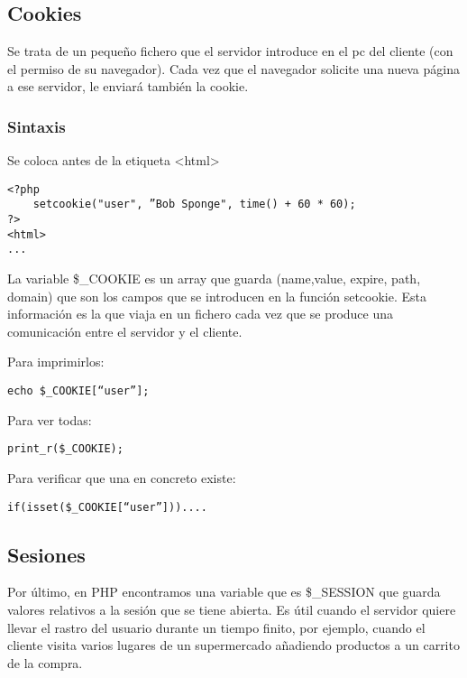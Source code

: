 \documentclass{apuntes}
\begin{document}
\subsection{Cookies}
Se trata de un pequeño fichero que el servidor introduce en el pc del cliente (con el permiso de su navegador). Cada vez que el navegador solicite una nueva página  a ese servidor, le enviará también la cookie.

\subsubsection{Sintaxis}
Se coloca antes de la etiqueta <html>
\begin{verbatim}
<?php
	setcookie("user", ”Bob Sponge", time() + 60 * 60);
?>
<html>
...
\end{verbatim}

La variable \$\_COOKIE es un array que guarda (name,value, expire, path, domain) que son los campos que se introducen en la función setcookie. Esta información es la que viaja en un fichero cada vez que se produce una comunicación entre el servidor y el cliente.

Para imprimirlos:

\begin{verbatim}
echo $_COOKIE[“user”];
\end{verbatim}
Para ver todas:
\begin{verbatim}
print_r($_COOKIE);
\end{verbatim}
Para verificar que una en concreto existe:
\begin{verbatim}
if(isset($_COOKIE[“user”]))....
\end{verbatim}

\subsection{Sesiones}
Por último, en PHP encontramos una variable que es \$\_SESSION que guarda valores relativos a la sesión que se tiene abierta. Es útil cuando el servidor quiere llevar el rastro del usuario durante un tiempo finito, por ejemplo, cuando el cliente visita varios lugares de un supermercado añadiendo productos a un carrito de la compra.
\end{document}
